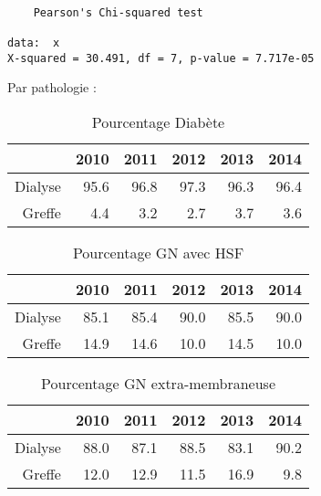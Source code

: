 \documentclass[11pt,a4paper]{article}\usepackage[]{graphicx}\usepackage[]{color}
\makeatletter
\newenvironment{kframe}{%
 \def\at@end@of@kframe{}%
 \ifinner\ifhmode%
  \def\at@end@of@kframe{\end{minipage}}%
  \begin{minipage}{\columnwidth}%
 \fi\fi%
 \def\FrameCommand##1{\hskip\@totalleftmargin \hskip-\fboxsep
 \colorbox{shadecolor}{##1}\hskip-\fboxsep
     \hskip-\linewidth \hskip-\@totalleftmargin \hskip\columnwidth}%
 \MakeFramed {\advance\hsize-\width
   \@totalleftmargin\z@ \linewidth\hsize
   \@setminipage}}%
 {\par\unskip\endMakeFramed%
 \at@end@of@kframe}
\newenvironment{knitrout}{}{} %
\makeatother
\begin{document}
\begin{knitrout}
\color{fgcolor}\begin{kframe}
\begin{verbatim}

	Pearson's Chi-squared test

data:  x
X-squared = 30.491, df = 7, p-value = 7.717e-05
\end{verbatim}
\end{kframe}
\end{knitrout}


Par pathologie :

\begin{multicols}{2}
\begin{table}[H]
\centering
\begin{tabular}{rrrrrr}
  \hline
 & 2010 & 2011 & 2012 & 2013 & 2014 \\ 
  \hline
Dialyse & 95.6 & 96.8 & 97.3 & 96.3 & 96.4 \\ 
  Greffe & 4.4 & 3.2 & 2.7 & 3.7 & 3.6 \\ 
   \hline
\end{tabular}
\caption{Pourcentage Diabète} 
\end{table}
\begin{table}[H]
\centering
\begin{tabular}{rrrrrr}
  \hline
 & 2010 & 2011 & 2012 & 2013 & 2014 \\ 
  \hline
Dialyse & 85.1 & 85.4 & 90.0 & 85.5 & 90.0 \\ 
  Greffe & 14.9 & 14.6 & 10.0 & 14.5 & 10.0 \\ 
   \hline
\end{tabular}
\caption{Pourcentage GN avec HSF} 
\end{table}
\begin{table}[H]
\centering
\begin{tabular}{rrrrrr}
  \hline
 & 2010 & 2011 & 2012 & 2013 & 2014 \\ 
  \hline
Dialyse & 88.0 & 87.1 & 88.5 & 83.1 & 90.2 \\ 
  Greffe & 12.0 & 12.9 & 11.5 & 16.9 & 9.8 \\ 
   \hline
\end{tabular}
\caption{Pourcentage GN extra-membraneuse} 
\end{table}

\end{multicols}
\end{document}
